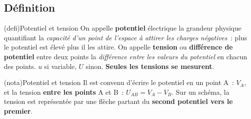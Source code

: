 \documentclass[../../main/main.tex]{subfiles}
\begin{document}
\subsection{Définition}
\begin{tcb*}[label=def:tension, sidebyside](defi){Potentiel et tension}
	On appelle \textbf{potentiel} électrique la grandeur physique quantifiant la
	\textit{capacité d'un point de l'espace à attirer les charges négatives}~:
	plus le potentiel est élevé plus il les attire.
	\bigbreak
	On appelle \textbf{tension} ou \textbf{différence de potentiel} entre deux
	points la \textit{différence entre les valeurs du potentiel} en chacun des
	points.
	\tcblower
	$u$ si variable, $U$ sinon.
	\textbf{Seules les tensions se mesurent}.
\end{tcb*}
\begin{tcb*}[label=nota:tension, sidebyside, righthand ratio=.4](nota){Potentiel
			et tension}
	Il est convenu d'écrire le potentiel en un point A~: $V_A$, et la
	tension \textbf{entre les points} A et B~: $U_{AB} = V_A - V_B$. Sur un
	schéma, la tension est représentée par une flèche partant du
	\textbf{second potentiel vers le premier}.
	\tcblower
	\begin{center}
	\end{center}
\end{tcb*}
\end{document}
